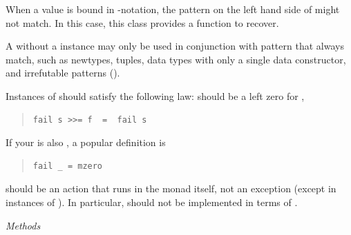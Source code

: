 \begin{haddockdesc}
\item[\begin{tabular}{@{}l}
class Monad m => MonadFail m where
\end{tabular}]
{\haddockbegindoc
When a value is bound in -notation, the pattern on the left
 hand side of \haddocktt{<-} might not match. In this case, this class
 provides a function to recover.\par
A  without a  instance may only be used in conjunction
 with pattern that always match, such as newtypes, tuples, data types with
 only a single data constructor, and irrefutable patterns ().\par
Instances of  should satisfy the following law:  should
 be a left zero for \haddockid{>>=},\par
\begin{quote}
{\haddockverb\begin{verbatim}
fail s >>= f  =  fail s
\end{verbatim}}
\end{quote}
If your  is also , a popular definition is\par
\begin{quote}
{\haddockverb\begin{verbatim}
fail _ = mzero
\end{verbatim}}
\end{quote}
 should be an action that runs in the monad itself, not an
 exception (except in instances of ).  In particular,
  should not be implemented in terms of .\par
\haddockpremethods{}\emph{Methods}
\begin{haddockdesc}
\item[\begin{tabular}{@{}l}
fail :: String -> m a
\end{tabular}]
\end{haddockdesc}}
\end{haddockdesc}
\begin{haddockdesc}
\item[\begin{tabular}{@{}l}
instance MonadFail IO\\instance MonadFail Maybe\\instance MonadFail {[}{]}
\end{tabular}]
\end{haddockdesc}
